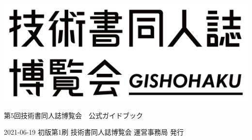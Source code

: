\clearpage{\thispagestyle{empty}}
\begin{center}

\includegraphics[width=0.75\linewidth]{images/chap-title/logo.png}
\vspace{80pt}

\begin{sffamily}
\Large
第5回技術書同人誌博覧会　公式ガイドブック
\normalsize
\end{sffamily}
\vspace{320pt}

\begin{sffamily}
2021-06-19
\hspace{5pt}
初版第1刷
\hspace{5pt}
技術書同人誌博覧会 運営事務局
\hspace{5pt}
発行
\end{sffamily}

\end{center}
